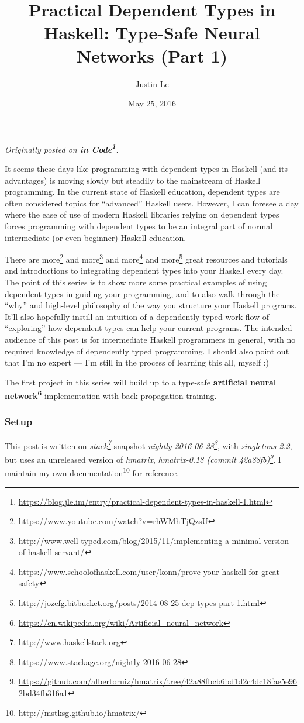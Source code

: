 \documentclass[]{article}
\title{Practical Dependent Types in Haskell: Type-Safe Neural Networks (Part 1)}
\author{Justin Le}
\date{May 25, 2016}
\renewcommand{\href}[2]{#2\footnote{\url{#1}}}
\begin{document}
\maketitle

\emph{Originally posted on
\textbf{\href{https://blog.jle.im/entry/practical-dependent-types-in-haskell-1.html}{in
Code}}.}

It seems these days like programming with dependent types in Haskell (and its
advantages) is moving slowly but steadily to the mainstream of Haskell
programming. In the current state of Haskell education, dependent types are
often considered topics for ``advanced'' Haskell users. However, I can foresee a
day where the ease of use of modern Haskell libraries relying on dependent types
forces programming with dependent types to be an integral part of normal
intermediate (or even beginner) Haskell education.

There are \href{https://www.youtube.com/watch?v=rhWMhTjQzsU}{more} and
\href{http://www.well-typed.com/blog/2015/11/implementing-a-minimal-version-of-haskell-servant/}{more}
and
\href{https://www.schoolofhaskell.com/user/konn/prove-your-haskell-for-great-safety}{more}
and
\href{http://jozefg.bitbucket.org/posts/2014-08-25-dep-types-part-1.html}{more}
great resources and tutorials and introductions to integrating dependent types
into your Haskell every day. The point of this series is to show more some
practical examples of using dependent types in guiding your programming, and to
also walk through the ``why'' and high-level philosophy of the way you structure
your Haskell programs. It'll also hopefully instill an intuition of a
dependently typed work flow of ``exploring'' how dependent types can help your
current programs. The intended audience of this post is for intermediate Haskell
programmers in general, with no required knowledge of dependently typed
programming. I should also point out that I'm no expert --- I'm still in the
process of learning this all, myself :)

The first project in this series will build up to a type-safe
\textbf{\href{https://en.wikipedia.org/wiki/Artificial_neural_network}{artificial
neural network}} implementation with back-propagation training.

\hypertarget{setup}{%
\subsubsection{Setup}\label{setup}}

This post is written on \emph{\href{http://www.haskellstack.org}{stack}}
snapshot
\emph{\href{https://www.stackage.org/nightly-2016-06-28}{nightly-2016-06-28}},
with \emph{singletons-2.2}, but uses an unreleased version of \emph{hmatrix},
\emph{\href{https://github.com/albertoruiz/hmatrix/tree/42a88fbcb6bd1d2c4dc18fae5e962bd34fb316a1}{hmatrix-0.18
(commit 42a88fb)}}. I \href{http://mstksg.github.io/hmatrix/}{maintain my own
documentation} for reference.
\end{document}
